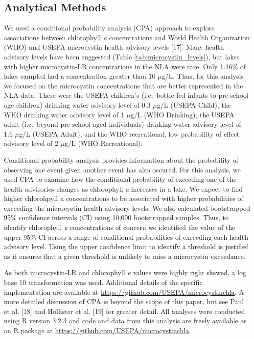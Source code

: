 \documentclass[11pt,]{article}
\begin{document}
\subsection{Analytical Methods}\label{analytical-methods}

We used a conditional probability analysis (CPA) approach to explore
associations between chlorophyll \emph{a} concentrations and World
Health Organization (WHO) and USEPA microcystin health advisory levels
{[}17{]}. Many health advisory levels have been suggested (Table
\ref{tab:microcystin_levels}), but lakes with higher microcystin-LR
concentrations in the NLA were rare. Only 1.16\% of lakes sampled had a
concentration greater than 10 \(\mu\)g/L. Thus, for this analysis we
focused on the microcystin concentrations that are better represented in
the NLA data. These were the USEPA children's (i.e.~bottle fed infants
to pre-school age children) drinking water advisory level of 0.3
\(\mu\)g/L (USEPA Child), the WHO drinking water advisory level of 1
\(\mu\)g/L (WHO Drinking), the USEPA adult (i.e.~beyond pre-school aged
individuals) drinking water advisory level of 1.6 \(\mu\)g/L (USEPA
Adult), and the WHO recreational, low probability of effect advisory
level of 2 \(\mu\)g/L (WHO Recreational).

Conditional probability analysis provides information about the
probability of observing one event given another event has also occured.
For this analysis, we used CPA to examine how the conditional
probability of exceeding one of the health advisories changes as
chlorophyll \emph{a} increases in a lake. We expect to find higher
chlorohpyll \emph{a} concentrations to be associated with higher
probabilities of exceeding the microcystin health advisory levels. We
also calculated bootstrapped 95\% confidence intervals (CI) using 10,000
bootstrapped samples. Thus, to identify chlorophyll \emph{a}
concentrations of concern we identified the value of the upper 95\% CI
across a range of conditional probabilities of exceeding each health
advisory level. Using the upper confidence limit to identify a threshold
is justified as it ensures that a given threshold is unlikely to miss a
microcystin exceedance.

As both microcystin-LR and chlorophyll \emph{a} values were highly right
skewed, a log base 10 transformation was used. Additional details of the
specific implementation are available at
\url{https://github.com/USEPA/microcystinchla}. A more detailed
discussion of CPA is beyond the scope of this paper, but see Paul et al.
{[}18{]} and Hollister et al. {[}19{]} for greater detail. All analyses
were conducted using R version 3.2.3 and code and data from this
analysis are freely available as an R package at
\url{https://github.com/USEPA/microcystinchla}.
\end{document}
